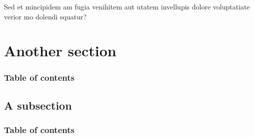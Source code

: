 \documentclass[
	aspectratio=169, %
	t, %
	onlytextwidth, %
	10pt, %
]{beamer}
\begin{document}

\begingroup
	
	\begin{frame}
		\begin{adjustwidth}{0cm}{0.15\textwidth} %
			{\Huge{\ImperialSansSemiBold Sed et mincipidem am fugia venihitem aut utatem invellupis dolore voluptatiate verior mo dolendi squatur?}}
		\end{adjustwidth}
	\end{frame}
\endgroup


\section{Another section}
\begin{frame}
    \frametitle{Table of contents}
    \tableofcontents[currentsection]
\end{frame}

\subsection{A subsection}
\begin{frame}
    \frametitle{Table of contents}
    \tableofcontents[currentsubsection]
\end{frame}
\end{document}
